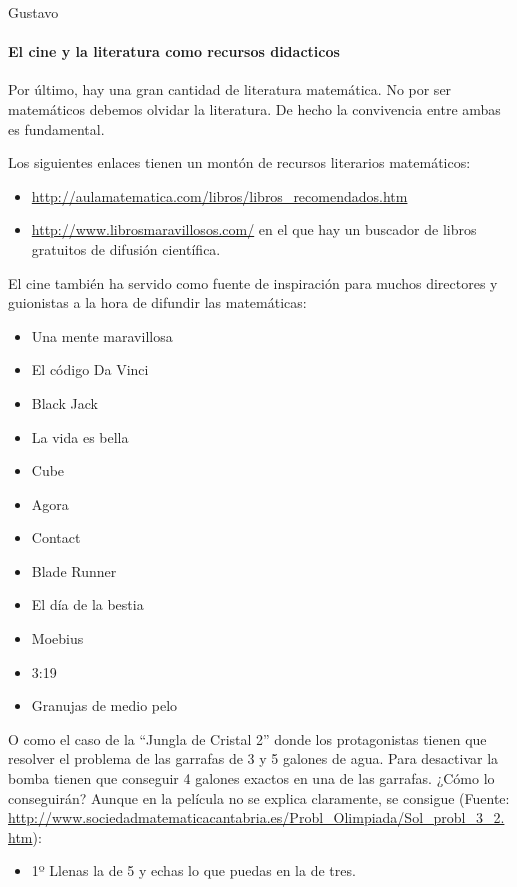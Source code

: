\begin{opin}{\guscolor}{Gustavo}
\paragraph{El cine y la literatura como recursos didacticos}
Por último, hay una gran cantidad de literatura matemática. No por ser matemáticos debemos olvidar la literatura. De hecho la convivencia entre ambas es fundamental.

Los siguientes enlaces tienen un montón de recursos literarios matemáticos:
\begin{itemize}
\item \url{http://aulamatematica.com/libros/libros_recomendados.htm}  

\item \url{http://www.librosmaravillosos.com/} en el que hay un buscador de libros gratuitos de difusión científica. 
\end{itemize}
El cine también ha servido como fuente de inspiración para muchos directores y guionistas a la hora de difundir las matemáticas:
\begin{itemize}
\item Una mente maravillosa 

\item El código Da Vinci 

\item Black Jack 

\item La vida es bella 

\item Cube 

\item Agora 

\item Contact 

\item Blade Runner 

\item El día de la bestia 

\item Moebius 

\item 3:19 

\item Granujas de medio pelo 
\end{itemize}
O como el caso de la “Jungla de Cristal 2” donde los protagonistas tienen que resolver el problema de las garrafas de 3 y 5 galones de agua. Para desactivar la bomba tienen que conseguir 4 galones exactos en una de las garrafas. ¿Cómo lo conseguirán? Aunque en la película no se explica claramente, se consigue (Fuente: \url{http://www.sociedadmatematicacantabria.es/Probl_Olimpiada/Sol_probl_3_2.htm}):
\begin{itemize}
\item 1º Llenas la de 5 y echas lo que puedas en la de tres.  


\end{itemize}
\end{opin}
